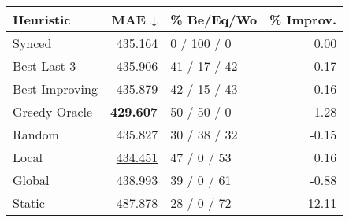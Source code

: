 \begin{tabular}{lrlr}
\toprule
\textbf{Heuristic} & \textbf{MAE ↓} & \textbf{\% Be/Eq/Wo} & \textbf{\% Improv.} \\
\midrule
            Synced &        435.164 &          0 / 100 / 0 &                0.00 \\
\midrule
       Best Last 3 &        435.906 &         41 / 17 / 42 &               -0.17 \\
    Best Improving &        435.879 &         42 / 15 / 43 &               -0.16 \\
\addlinespace
     Greedy Oracle &        \textbf{429.607} &          50 / 50 / 0 &                1.28 \\
            Random &        435.827 &         30 / 38 / 32 &               -0.15 \\
\midrule
             Local &        \underline{434.451} &          47 / 0 / 53 &                0.16 \\
            Global &        438.993 &          39 / 0 / 61 &               -0.88 \\
\midrule
            Static &        487.878 &          28 / 0 / 72 &              -12.11 \\
\bottomrule
\end{tabular}

\label{tab:non_lr05_le2_bs4_Summary}
